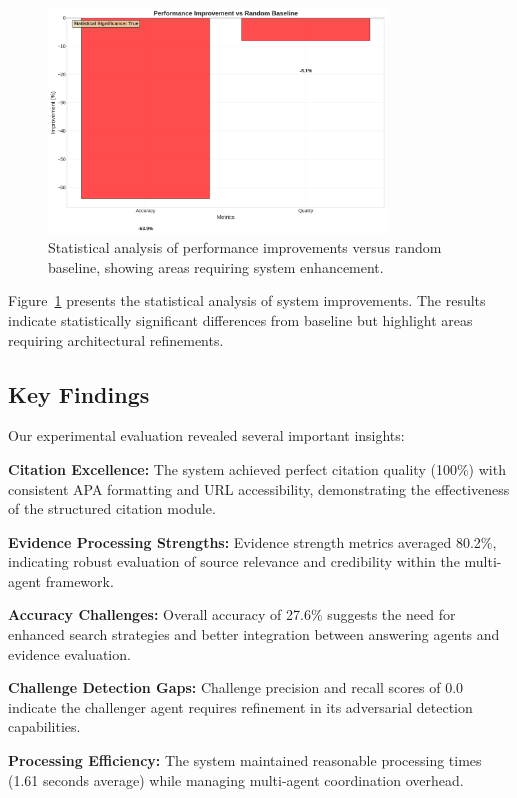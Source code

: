 \documentclass[11pt,a4paper]{article}
\begin{document}
\begin{figure}[htbp]
\centering
\includegraphics[width=0.8\textwidth]{figures/improvement_analysis.png}
\caption{Statistical analysis of performance improvements versus random baseline, showing areas requiring system enhancement.}
\label{fig:improvement_analysis}
\end{figure}

Figure~\ref{fig:improvement_analysis} presents the statistical analysis of system improvements. The results indicate statistically significant differences from baseline but highlight areas requiring architectural refinements.

\subsection{Key Findings}

Our experimental evaluation revealed several important insights:

\textbf{Citation Excellence:} The system achieved perfect citation quality (100\%) with consistent APA formatting and URL accessibility, demonstrating the effectiveness of the structured citation module.

\textbf{Evidence Processing Strengths:} Evidence strength metrics averaged 80.2\%, indicating robust evaluation of source relevance and credibility within the multi-agent framework.

\textbf{Accuracy Challenges:} Overall accuracy of 27.6\% suggests the need for enhanced search strategies and better integration between answering agents and evidence evaluation.

\textbf{Challenge Detection Gaps:} Challenge precision and recall scores of 0.0 indicate the challenger agent requires refinement in its adversarial detection capabilities.

\textbf{Processing Efficiency:} The system maintained reasonable processing times (1.61 seconds average) while managing multi-agent coordination overhead.
\end{document}
